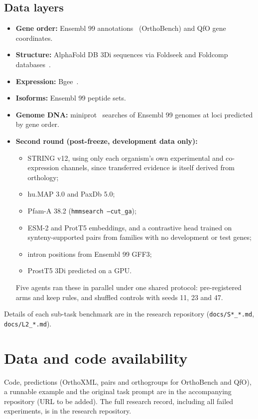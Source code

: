\documentclass[10pt,letterpaper]{article}
\begin{document}
\subsection*{Data layers}
\begin{itemize}
\item \textbf{Gene order:} Ensembl 99 annotations~\cite{yates2019ensembl} (OrthoBench) and QfO gene coordinates.
\item \textbf{Structure:} AlphaFold DB 3Di sequences via Foldseek and Foldcomp databases~\cite{vankempen2024foldseek,kim2023foldcomp,varadi2024alphafolddb}.
\item \textbf{Expression:} Bgee~\cite{bastian2025bgee}.
\item \textbf{Isoforms:} Ensembl 99 peptide sets.
\item \textbf{Genome DNA:} miniprot~\cite{li2023miniprot} searches of Ensembl 99 genomes at loci predicted by gene order.
\item \textbf{Second round (post-freeze, development data only):}
  \begin{itemize}
  \item STRING v12, using only each organism's own experimental and co-expression channels, since transferred evidence is itself derived from orthology;
  \item hu.MAP 3.0 and PaxDb 5.0;
  \item Pfam-A 38.2 (\texttt{hmmsearch --cut\_ga});
  \item ESM-2 and ProtT5 embeddings, and a contrastive head trained on synteny-supported pairs from families with no development or test genes;
  \item intron positions from Ensembl 99 GFF3;
  \item ProstT5 3Di predicted on a GPU.
  \end{itemize}
  Five agents ran these in parallel under one shared protocol: pre-registered arms and keep rules, and shuffled controls with seeds 11, 23 and 47.
\end{itemize}
Details of each sub-task benchmark are in the research repository (\texttt{docs/S*\_*.md}, \texttt{docs/L2\_*.md}).

\section*{Data and code availability}
Code, predictions (OrthoXML, pairs and orthogroups for OrthoBench and QfO), a runnable example and the original task prompt are in the accompanying repository (URL to be added). The full research record, including all failed experiments, is in the research repository.
\end{document}
